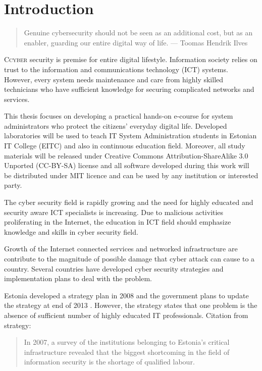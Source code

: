 \chapter{Introduction}
\label{Introduction}

 
\begin{quote}
Genuine cybersecurity should not be seen as an additional cost, but as an enabler, guarding our entire digital way of life. --- Toomas Hendrik Ilves
\end{quote}

\lettrine[lraise=0.1, nindent=0em, slope=-.5em]{\color{Violet}C}{cyber} security is premise for entire digital lifestyle. Information society relies on trust to the information and communications technology (\gls{ICT}) systems. However, every system needs maintenance and care from highly skilled technicians who have sufficient knowledge for securing complicated networks and services. 

This thesis focuses on developing a practical hands-on e-course for system administrators who protect the citizens' everyday digital life. Developed laboratories will be used to teach IT System Administration students in Estonian IT College (\gls{EITC}) and also in continuous education field. Moreover, all study materials will be released under Creative Commons Attribution-ShareAlike 3.0 Unported  (\gls{CC-BY-SA}) license and all software developed during this work will be distributed under \gls{MIT} licence and can be used by any institution or interested party.

The cyber security field is rapidly growing and the need for highly educated and security aware \gls{ICT} specialists is increasing. Due to  malicious activities proliferating in the Internet, the education in \gls{ICT} field should emphasize knowledge and skills in cyber security field.

Growth of the Internet connected services and networked infrastructure are contribute to the magnitude of possible damage that cyber attack can cause to a country. Several countries have developed cyber security strategies and implementation plans to deal with the problem.

Estonia developed a strategy plan in 2008 \citep{Strategy2008} and the government plans to update the strategy at end of 2013 \citep{StrategyProposal2013}. However, the strategy states that one problem is the absence of sufficient number of highly educated IT professionals. Citation from strategy:  
\begin{quote}
In 2007, a survey of the institutions belonging to Estonia’s critical infrastructure revealed that the biggest shortcoming in the field of information security is the shortage of qualified labour. \citep[p.~16]{Strategy2008}
\end{quote}



